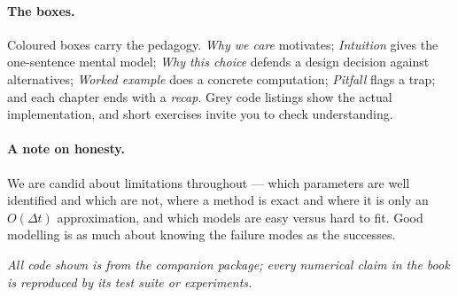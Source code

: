 \paragraph{The boxes.} Coloured boxes carry the pedagogy. \emph{Why we care}
motivates; \emph{Intuition} gives the one-sentence mental model; \emph{Why this
choice} defends a design decision against alternatives; \emph{Worked example} does
a concrete computation; \emph{Pitfall} flags a trap; and each chapter ends with a
\emph{recap}. Grey code listings show the actual implementation, and short
exercises invite you to check understanding.

\paragraph{A note on honesty.} We are candid about limitations throughout --- which
parameters are well identified and which are not, where a method is exact and where
it is only an $O(\Delta t)$ approximation, and which models are easy versus hard to
fit. Good modelling is as much about knowing the failure modes as the successes.

\bigskip
\noindent\emph{All code shown is from the companion package; every numerical claim
in the book is reproduced by its test suite or experiments.}
